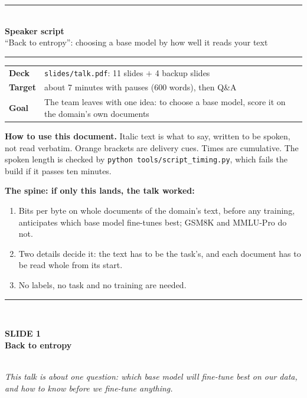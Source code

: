\documentclass[11pt,a4paper]{article}
\newcommand{\slide}[3]{%
  \vspace{1.0em}%
  {\color{rule}\rule{\textwidth}{0.6pt}}\\[0.35em]%
  \begin{minipage}[t]{0.78\textwidth}%
    {\color{accent}\footnotesize\bfseries SLIDE #1}\\[0.15em]%
    {\large\bfseries #2}%
  \end{minipage}\hfill%
  \begin{minipage}[t]{0.20\textwidth}%
    \raggedleft{\footnotesize\color{mute}#3}%
  \end{minipage}\\[0.5em]%
}
\newenvironment{say}{\itshape}{\par}
\begin{document}
{\color{rule}\rule{\textwidth}{0.9pt}}\\[0.9em]
{\LARGE\bfseries Speaker script}\\[0.4em]
{\large\color{mute} ``Back to entropy'': choosing a base model by how well it reads your text}\\[0.9em]
{\color{rule}\rule{\textwidth}{0.9pt}}

\vspace{0.6em}
\begin{tabular}{@{}ll@{}}
\textbf{Deck} & \texttt{slides/talk.pdf}: 11 slides $+$ 4 backup slides \\
\textbf{Target} & about 7 minutes with pauses (600 words), then Q\&A \\
\textbf{Goal} & The team leaves with one idea: to choose a base model, score it on the domain's own documents \\
\end{tabular}

\vspace{1.0em}
\textbf{How to use this document.} Italic text is what to say, written to be spoken, not read
verbatim. Orange brackets are delivery cues. Times are cumulative. The spoken length is checked by
\texttt{python tools/script\_timing.py}, which fails the build if it passes ten minutes.

\vspace{0.4em}
\setlength{\fboxsep}{9pt}
\colorbox{wash}{\parbox{\dimexpr\textwidth-2\fboxsep\relax}{%
\textbf{The spine: if only this lands, the talk worked:}
\begin{enumerate}[leftmargin=1.4em,itemsep=0.15em,topsep=0.35em]
  \item Bits per byte on whole documents of the domain's text, before any training, anticipates
  which base model fine-tunes best; GSM8K and MMLU-Pro do not.
  \item Two details decide it: the text has to be the task's, and each document has to be read
  whole from its start.
  \item No labels, no task and no training are needed.
\end{enumerate}}}

\slide{1}{Back to entropy}{0:00--0:15}
\begin{say}
This talk is about one question: which base model will fine-tune best on our data, and how to
know before we fine-tune anything.
\end{say}
\end{document}
